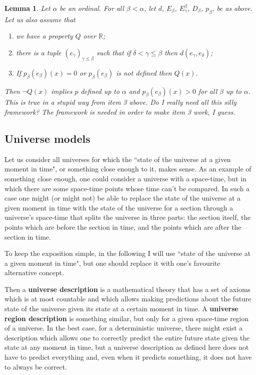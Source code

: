 \documentclass[a4paper
,draft
]{article}
\def\reale{\mathbb{R}}
\newcommand{\definitie}[1]{\textbf{#1}}
\newcommand{\ghilimele}[1]{``#1"}
\newtheorem{lemma}{Lemma}
\begin{document}
\begin{lemma}
  Let $\alpha$ be an ordinal. For all $\beta < \alpha$, let $d$,
  $E_\beta$, $E^\beta_\gamma$, $D_\beta$,
  $p_\beta$, be as above. Let us also assume that
  \begin{enumerate}
    \item we have a property $Q$ over $\reale$;
    \item there is a tuple $(e_\gamma)_{\gamma \le \beta}$ such that if
          $\delta < \gamma \le \beta$ then $d(e_\gamma, e_\delta)$;
    \item If $p_\beta(e_\beta)(x) = 0$ or $p_\beta(e_\beta)$ is not defined
          then $Q(x)$.
  \end{enumerate}

  Then $\neg Q(x)$ implies $p$ defined up to $\alpha$ and
  $p_\beta(e_\beta)(x) > 0$ for all $\beta$ up to $\alpha$.
\proof
  This is true in a stupid way from item 3 above. Do I really need all this
  silly framework? The framework is needed in order to make item 3 work,
  I guess.
\end{lemma}


\subsection{Universe models}

Let us consider all universes for which the \ghilimele{state of the universe at a given moment in time}, or something close enough to it, makes sense. As an example of something close enough, one could consider a universe with a space-time, but in which there are some space-time points whose time can't be compared. In such a case one might (or might not) be able to replace the state of the universe at a given moment in time with the state of the universe for a section through a universe's space-time that splits the universe in three parts: the section itself, the points which are before the section in time, and the points which are after the section in time.

To keep the exposition simple, in the following I will use \ghilimele{state of the universe at a given moment in time}, but one should replace it with one's favourite alternative concept.

Then a \definitie{universe description} is a mathematical theory that has a set of axioms which is at most countable and which allows making predictions about the future state of the universe given its state at a certain moment in time. A \definitie{universe region description} is something similar, but only for a given space-time region of a universe. In the best case, for a deterministic universe, there might exist a description which allows one to correctly predict the entire future state given the state at any moment in time, but a universe description as defined here does not have to predict everything and, even when it predicts something, it does not have to always be correct.
\end{document}

